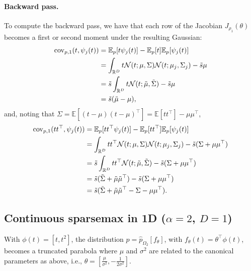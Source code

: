 \documentclass{article}
\begin{document}
\paragraph{Backward pass.}
To compute the backward pass, we have that each row of the Jacobian $J_{\rho_1}(\theta)$ becomes a first or second moment under the resulting Gaussian:
\begin{equation}\label{eq:continuous_softmax_backward_pass_01}
\begin{split}
\mathrm{cov}_{p,1}(t, \psi_j(t)) & = \mathbb{E}_p[t\psi_j(t)]-\mathbb{E}_p[t]\mathbb{E}_p[\psi_j(t)]\\
 & =\int_{\mathbb{R}^D}t\mathcal{N}(t;\mu, \Sigma)\mathcal{N}(t;\mu_j, \Sigma_j)-\Tilde{s}\mu\\
 & =\Tilde{s}\int_{\mathbb{R}^D}t\mathcal{N}(t;\Tilde{\mu}, \Tilde{\Sigma})-\Tilde{s}\mu \\
 & =\Tilde{s}(\Tilde{\mu}-\mu),
\end{split}
\end{equation} and, noting that $\Sigma=\mathbb{E}[(t-\mu)(t-\mu)^\top]=\mathbb{E}[tt^\top]-\mu\mu^\top$,
\begin{equation}\label{eq:continuous_softmax_backward_pass_02}
\begin{split}
\mathrm{cov}_{p,1}(tt^\top, \psi_j(t)) & = \mathbb{E}_p[tt^\top\psi_j(t)]-\mathbb{E}_p[tt^\top]\mathbb{E}_p[\psi_j(t)]\\
 & =\int_{\mathbb{R}^D}tt^\top\mathcal{N}(t;\mu, \Sigma)\mathcal{N}(t;\mu_j, \Sigma_j)-\Tilde{s}(\Sigma+\mu\mu^\top)\\
 &=\Tilde{s}\int_{\mathbb{R}^D}tt^\top\mathcal{N}(t;\Tilde{\mu}, \Tilde{\Sigma})-\Tilde{s}(\Sigma+\mu\mu^\top)\\
 &=\Tilde{s}(\Tilde{\Sigma}+\Tilde{\mu}\Tilde{\mu}^\top)-\Tilde{s}(\Sigma+\mu\mu^\top)\\
 &=\Tilde{s}(\Tilde{\Sigma}+\Tilde{\mu}\Tilde{\mu}^\top-\Sigma-\mu\mu^\top).
\end{split}
\end{equation}


\subsection{Continuous sparsemax in 1D ($\alpha=2$, $D=1$)}

With $\phi(t) = [t, t^2]$, the distribution $p = \hat{p}_{\Omega_2}[f_\theta]$, with $f_\theta(t) = \theta^\top \phi(t)$, becomes a truncated parabola where  $\mu$ and  $\sigma^2$ are related to the canonical parameters as above, i.e., $\theta = [\frac{\mu}{\sigma^2}, -\frac{1}{2\sigma^2}]$.
\end{document}
